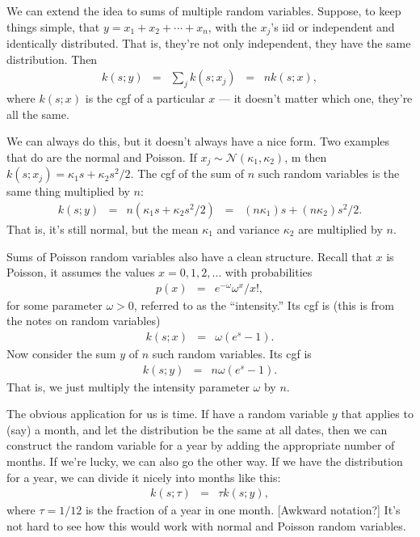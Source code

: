 \documentclass[11pt]{article}
\begin{document}
We can extend the idea to sums of multiple random variables.
Suppose, to keep things simple, that $ y = x_1 + x_2 + \cdots + x_n$,
with the $x_j$'s iid or independent and identically distributed.
That is, they're not only independent, they have the same distribution.
Then
\begin{eqnarray*}
    k(s; y) &=& \sum_j k(s; x_j)
            \;\;=\;\; n k(s; x) ,
\end{eqnarray*}
where $k(s; x)$ is the cgf of a particular $x$ ---
it doesn't matter which one, they're all the same.

We can always do this, but it doesn't always have a nice form.
Two examples that do are the normal and Poisson.
If $x_j \sim \mathcal{N}(\kappa_1, \kappa_2)$, m
then $ k(s; x_j) = \kappa_1 s + \kappa_2 s^2/2 $.
The cgf of the sum of $n$ such random variables is
the same thing multiplied by $n$:
\begin{eqnarray*}
    k(s; y) &=& n ( \kappa_1 s + \kappa_2 s^2/2 )
            \;\;=\;\; (n \kappa_1) s + (n\kappa_2) s^2/2 .
\end{eqnarray*}
That is, it's still normal, but the mean $\kappa_1$
and variance $\kappa_2$ are multiplied by $n$.

Sums of Poisson random variables also have a clean structure.
Recall that $x$ is Poisson, it assumes the values $x= 0, 1, 2, \ldots $
with probabilities
\begin{eqnarray*}
    p(x) &=& e^{-\omega} \omega^x / x! ,
\end{eqnarray*}
for some parameter $\omega > 0$, referred to as the ``intensity.''
Its cgf is (this is from the notes on random variables)
\begin{eqnarray*}
    k(s; x) &=& \omega \left( e^{s} -1 \right) .
\end{eqnarray*}
Now consider the sum $y$ of $n$ such random variables.
Its cgf is
\begin{eqnarray*}
    k(s; y) &=& n \omega \left( e^{s} -1 \right) .
\end{eqnarray*}
That is, we just multiply the intensity parameter $\omega$ by $n$.

The obvious application for us is time.
If have a random variable $y$ that applies to (say) a month,
and let the distribution be the same at all dates,
then we can construct the random variable for a year by adding
the appropriate number of months.
If we're lucky, we can also go the other way.
If we have the distribution for a year, we can divide it nicely
into months like this:
\begin{eqnarray*}
    k(s; \tau) &=&  \tau k(s; y) ,
\end{eqnarray*}
where $\tau = 1/12$ is the fraction of a year in one month.
[Awkward notation?]
It's not hard to see how this would work with normal
and Poisson random variables.
\end{document}
